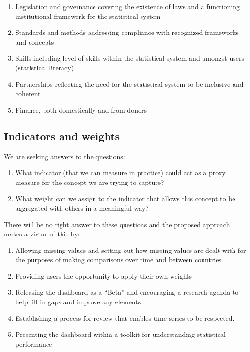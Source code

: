 \documentclass[
]{article}
\providecommand{\tightlist}{%
  \setlength{\itemsep}{0pt}\setlength{\parskip}{0pt}}
\begin{document}
\begin{enumerate}
\def\labelenumi{\arabic{enumi}.}
\tightlist
\item
  Legislation and governance covering the existence of laws and a functioning institutional framework for the statistical system\\
\item
  Standards and methods addressing compliance with recognized frameworks and concepts\\
\item
  Skills including level of skills within the statistical system and amongst users (statistical literacy)\\
\item
  Partnerships reflecting the need for the statistical system to be inclusive and coherent\\
\item
  Finance, both domestically and from donors
\end{enumerate}

\hypertarget{indicators-and-weights}{%
\subsection{Indicators and weights}\label{indicators-and-weights}}

We are seeking answers to the questions:

\begin{enumerate}
\def\labelenumi{\arabic{enumi}.}
\tightlist
\item
  What indicator (that we can measure in practice) could act as a proxy measure for the concept we are trying to capture?\\
\item
  What weight can we assign to the indicator that allows this concept to be aggregated with others in a meaningful way?
\end{enumerate}

There will be no right answer to these questions and the proposed approach makes a virtue of this by:

\begin{enumerate}
\def\labelenumi{\arabic{enumi}.}
\tightlist
\item
  Allowing missing values and setting out how missing values are dealt with for the purposes of making comparisons over time and between countries\\
\item
  Providing users the opportunity to apply their own weights\\
\item
  Releasing the dashboard as a ``Beta'' and encouraging a research agenda to help fill in gaps and improve any elements\\
\item
  Establishing a process for review that enables time series to be respected.\\
\item
  Presenting the dashboard within a toolkit for understanding statistical performance
\end{enumerate}
\end{document}
